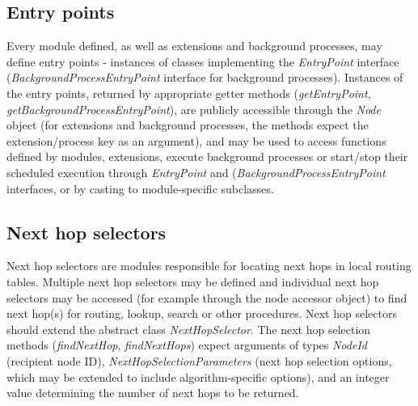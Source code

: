 \subsection{Entry points}
\label{sec:libEntryPoints}

Every module defined, as well as extensions and background processes, may define entry points - instances of classes implementing the \emph{EntryPoint} interface (\emph{BackgroundProcessEntryPoint} interface for background processes). Instances of the entry points, returned by appropriate getter methods (\emph{getEntryPoint}, \emph{getBackgroundProcessEntryPoint}), are publicly accessible through the \emph{Node} object (for extensions and background processes, the methods expect the extension/process key as an argument), and may be used to access functions defined by modules, extensions, execute background processes or start/stop their scheduled execution through \emph{EntryPoint} and (\emph{BackgroundProcessEntryPoint} interfaces, or by casting to module-specific subclasses.






\subsection{Next hop selectors}

Next hop selectors are modules responsible for locating next hops in local routing tables. Multiple next hop selectors may be defined and individual next hop selectors may be accessed (for example through the node accessor object) to find next hop(s) for routing, lookup, search or other procedures. Next hop selectors should extend the abstract class \emph{NextHopSelector}. The next hop selection methods (\emph{findNextHop}, \emph{findNextHops}) expect arguments of types \emph{NodeId} (recipient node ID), \emph{NextHopSelectionParameters} (next hop selection options, which may be extended to include algorithm-specific options), and an integer value determining the number of next hops to be returned.

